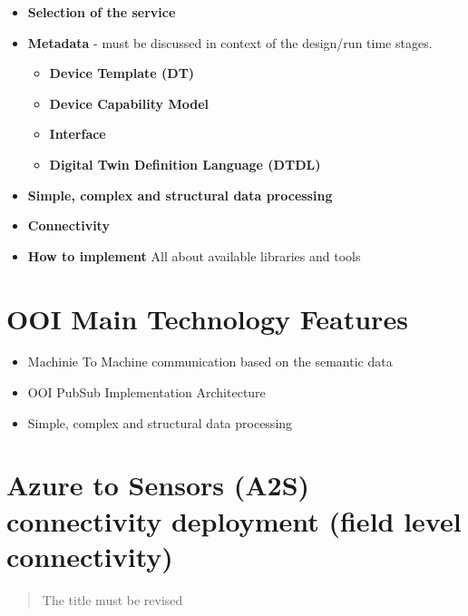 \documentclass{jacsart}
\providecommand{\tightlist} { \setlength{\itemsep}{0pt}\setlength{\parskip}{0pt}}
\begin{document}
\begin{itemize}
  \tightlist
  \item
        \textbf{Selection of the service}
  \item
        \textbf{Metadata} - must be discussed in context of the design/run
        time stages.

        \begin{itemize}
          \tightlist
          \item
                \textbf{Device Template (DT)}
          \item
                \textbf{Device Capability Model}
          \item
                \textbf{Interface}
          \item
                \textbf{Digital Twin Definition Language (DTDL)}
        \end{itemize}
  \item
        \textbf{Simple, complex and structural data processing}
  \item
        \textbf{Connectivity}
  \item
        \textbf{How to implement} All about available libraries and tools
\end{itemize}

\hypertarget{ooi-main-technology-features}{%
  \section{OOI Main Technology
    Features}\label{ooi-main-technology-features}}

\begin{itemize}
  \tightlist
  \item
        Machinie To Machine communication based on the semantic data
  \item
        OOI PubSub Implementation Architecture
  \item
        Simple, complex and structural data processing
\end{itemize}

\hypertarget{azure-to-sensors-a2s-connectivity-deployment-field-level-connectivity}{%
  \section{Azure to Sensors (A2S) connectivity deployment (field level
    connectivity)}\label{azure-to-sensors-a2s-connectivity-deployment-field-level-connectivity}}

\begin{quote}
  The title must be revised
\end{quote}
\end{document}
